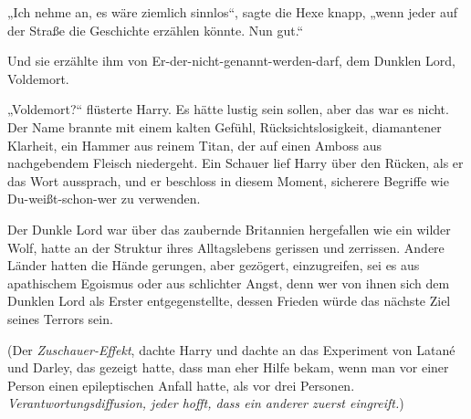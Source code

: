 „Ich nehme an, es wäre ziemlich sinnlos“, sagte die Hexe knapp, „wenn jeder auf der Straße die Geschichte erzählen könnte. Nun gut.“

Und sie erzählte ihm von Er-der-nicht-genannt-werden-darf, dem Dunklen Lord, Voldemort.

„Voldemort?“ flüsterte Harry. Es hätte lustig sein sollen, aber das war es nicht. Der Name brannte mit einem kalten Gefühl, Rücksichtslosigkeit, diamantener Klarheit, ein Hammer aus reinem Titan, der auf einen Amboss aus nachgebendem Fleisch niedergeht. Ein Schauer lief Harry über den Rücken, als er das Wort aussprach, und er beschloss in diesem Moment, sicherere Begriffe wie Du-weißt-schon-wer zu verwenden.

Der Dunkle Lord war über das zaubernde Britannien hergefallen wie ein wilder Wolf, hatte an der Struktur ihres Alltagslebens gerissen und zerrissen.
Andere Länder hatten die Hände gerungen, aber gezögert, einzugreifen, sei es aus apathischem Egoismus oder aus schlichter Angst, denn wer von ihnen sich dem Dunklen Lord als Erster entgegenstellte, dessen Frieden würde das nächste Ziel seines Terrors sein.

(Der \emph{Zuschauer-Effekt}, dachte Harry und dachte an das Experiment von Latané und Darley, das gezeigt hatte, dass man eher Hilfe bekam, wenn man vor einer Person einen epileptischen Anfall hatte, als vor drei Personen. \emph{Verantwortungsdiffusion, jeder hofft, dass ein anderer zuerst eingreift.})


